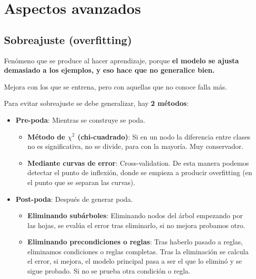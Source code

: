 \documentclass[12pt, twoside, openright]{report} %
\begin{document}
\section{Aspectos avanzados}

\subsection{Sobreajuste
	(overfitting)}

Fenómeno que se produce al hacer aprendizaje, porque \textbf{el modelo se ajusta demasiado a los ejemplos, y eso hace que no generalice bien.}

Mejora con los que se entrena, pero con aquellas que no conoce falla más.

Para evitar sobreajuste se debe generalizar, hay \textbf{2 métodos}:

\begin{itemize}
	\item \textbf{Pre-poda}: Mientras se construye se poda.

	      \begin{itemize}
		      \item \textbf{Método de \(\chi^2\) (chi-cuadrado)}: Si en un nodo la diferencia entre clases no es significativa, no se divide, para con la mayoría. Muy conservador.
		      \item \textbf{Mediante curvas de error}: Cross-validation. De esta manera podemos detectar el punto de inflexión, donde se empieza a producir overfitting (en el punto que se separan las curvas).
	      \end{itemize}
	\item \textbf{Post-poda}: Después de generar poda.

	      \begin{itemize}
		      \item \textbf{Eliminando subárboles}: Eliminando nodos del árbol empezando por las hojas, se evalúa el error tras eliminarlo, si no mejora probamos otro.
		      \item \textbf{Eliminando precondiciones o reglas}: Tras haberlo pasado a reglas, eliminamos condiciones o reglas completas. Tras la eliminación se calcula el error, si mejora, el modelo principal pasa a ser el que lo eliminó y se sigue probado. Si no se prueba otra condición o regla.
	      \end{itemize}
\end{itemize}
\end{document}
